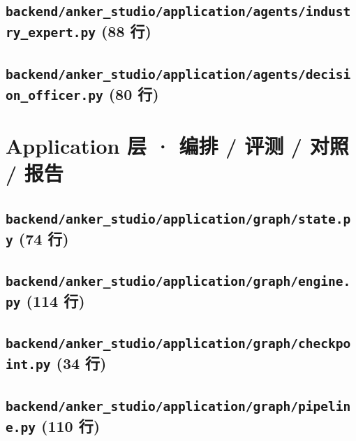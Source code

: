 \subsection*{\texttt{backend/anker\_studio/application/agents/industry\_expert.py} \hfill \normalfont\small (88 行)}


\subsection*{\texttt{backend/anker\_studio/application/agents/decision\_officer.py} \hfill \normalfont\small (80 行)}


\section{Application 层 · 编排 / 评测 / 对照 / 报告}
\subsection*{\texttt{backend/anker\_studio/application/graph/state.py} \hfill \normalfont\small (74 行)}


\subsection*{\texttt{backend/anker\_studio/application/graph/engine.py} \hfill \normalfont\small (114 行)}


\subsection*{\texttt{backend/anker\_studio/application/graph/checkpoint.py} \hfill \normalfont\small (34 行)}


\subsection*{\texttt{backend/anker\_studio/application/graph/pipeline.py} \hfill \normalfont\small (110 行)}


